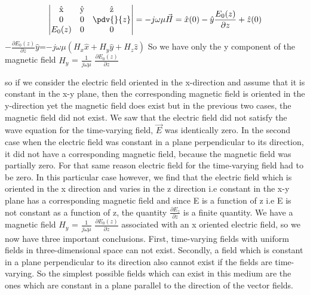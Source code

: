 \begin{dmath*}
\begin{vmatrix}
$\^{x}$ & $\^{y}$ & $\^{z}$\\
0 & 0 & \pdv{}{z} \\
$$E_{0}(z)$$ & 0 & 0
\end{vmatrix}=-j\omega\mu\vec{H}=\hat{x}(0) - \hat{y}\frac{E_{0}(z)}{\partial z} + \hat{z}(0)
\end{dmath*}			
$-\frac{\partial E_{0}(z)}{\partial z}\hat{y}$=$-j\omega\mu(H_{x}\hat{x} + H_{y}\hat{y} + H_{z}\hat{z} )$
So we have only the y component of the magnetic field $H_{y}$ = $\frac{1}{j\omega\mu}$ $\frac{\partial E_{0}(z)}{\partial z}$

so if we consider the electric field oriented in the x-direction and assume that it is constant in the x-y plane, then the corresponding magnetic field is oriented in the y-direction yet the magnetic field does exist but in the previous two cases, the magnetic field did not exist. We saw that the electric field did not satisfy the wave equation for the time-varying field, $\vec{E}$ was identically zero. In the second case when the electric field was constant in a plane perpendicular to its direction, it did not have a corresponding magnetic field, because the magnetic field was partially zero. For that same reason electric field for the time-varying field had to be zero.   
In this particular case however, we find that the electric field which is oriented in the x direction and varies in the z direction i.e constant in the x-y plane has a corresponding magnetic field and since E is a function of z i.e E is not constant as a function of z, the quantity $\frac{\partial {E_z}}{\partial {z}}$ is a finite quantity. We have a magnetic field $H_{y}$ = $\frac{1}{j\omega\mu}$ $\frac{\partial E_{0}(z)}{\partial z}$ associated with an x oriented electric field, so we now have three important conclusions. First, time-varying fields with uniform fields in three-dimensional space can not exist. Secondly, a field which is constant in a plane perpendicular to its direction also cannot exist if the fields are time-varying. So the simplest possible fields which can exist in this medium are the ones which are constant in a plane parallel to the direction of the vector fields.

